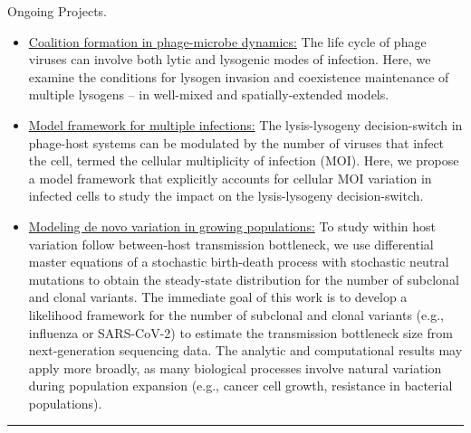 \documentclass[a4paper,10pt]{article}
\newlength{\cvcolumngapwidth}
\newlength{\cvleftcolumnwidth}
\newlength{\cvrightcolumnwidth}
\newcommand{\cvsectionstyle}[1]{{\normalsize\cvsectionfont\textcolor{cvsectioncolor}{#1}}}
\newcommand{\cvtitlestyle}[1]{{\large\cvtitlefont\textcolor{cvtitlecolor}{#1}}}
\newcommand{\cvdurationstyle}[1]{{\small\cvdurationfont\textcolor{cvdurationcolor}{#1}}}
\newlength{\cvafteritemskipamount}
\newlength{\cvaftersectionskipamount}
\newlength{\cvbetweensectionandheadingextraskipamount}
\newlength{\cvaftertitleskipamount}
\newlength{\cvparskip}
\newcommand{\cvsection}[1]{
            \begin{minipage}[t]{\cvleftcolumnwidth}
                \raggedleft\cvsectionstyle{#1}
            \end{minipage}%
            \hspace{\cvcolumngapwidth}%
            \begin{minipage}[t]{\cvrightcolumnwidth}
                \textcolor{cvrulecolor}{\rule{\cvrightcolumnwidth}{0.3mm}}
            \end{minipage}
        
            \vspace{\cvaftersectionskipamount}
        }
\newcommand{\cvitem}[2]{
            \begin{minipage}[t]{\cvleftcolumnwidth}
                \raggedleft #1
            \end{minipage}%
            \hspace{\cvcolumngapwidth}%
            \begin{minipage}[t]{\cvrightcolumnwidth}
                \setlength{\parskip}{\cvparskip} #2
            \end{minipage}
        
            \vspace{\cvafteritemskipamount}
        }
\newcommand{\cvtitle}[1]{
            \cvtitlestyle{#1}
        
            \vspace{\cvaftertitleskipamount}
            \vspace{-\cvparskip}
        }
\begin{document}
                \cvitem{
            \cvdurationstyle{Ongoing Projects.}
        }{
            \begin{itemize}[leftmargin=*]
                	\item {\underline{Coalition formation in phage-microbe dynamics:}} The life cycle of phage viruses can involve both lytic and lysogenic modes of infection. Here, we examine the conditions for lysogen invasion and coexistence maintenance of multiple lysogens -- in well-mixed and spatially-extended models.
        	        \item {\underline{Model framework for multiple infections:}} The lysis-lysogeny decision-switch in phage-host systems can be modulated by the number of viruses that infect the cell, termed the cellular multiplicity of infection (MOI). Here, we propose a model framework that explicitly accounts for cellular MOI variation in infected cells to study the impact on the lysis-lysogeny decision-switch.
		\item {\underline{Modeling de novo variation in growing populations:}} To study within host variation follow between-host transmission bottleneck, we use differential master equations of a stochastic birth-death process with stochastic neutral mutations to obtain the steady-state distribution for the number of subclonal and clonal variants. The immediate goal of this work is to develop a likelihood framework for the number of subclonal and clonal variants (e.g., influenza or SARS-CoV-2) to estimate the transmission bottleneck size from next-generation sequencing data. The analytic and computational results may apply more broadly, as many biological processes involve natural variation during population expansion (e.g., cancer cell growth, resistance in bacterial populations).
            \end{itemize}
        }
        
       
        \cvsection{TEACHING EXPERIENCE}
        \vspace{\cvbetweensectionandheadingextraskipamount}
	
\end{document}
